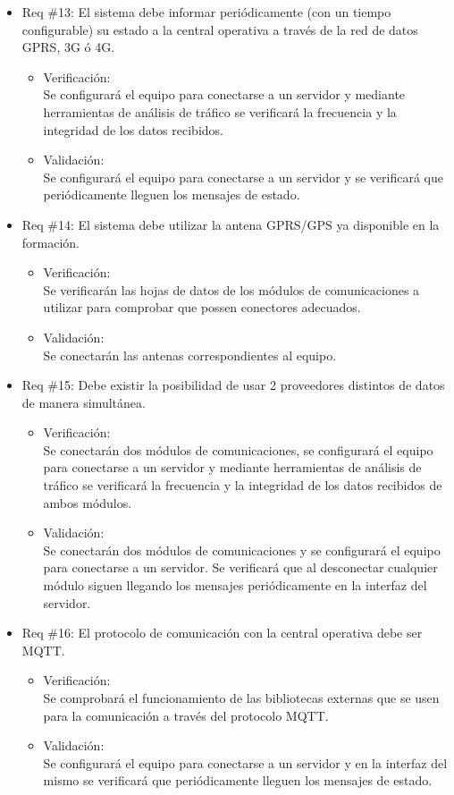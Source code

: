 \documentclass[11pt]{charter}
\begin{document}
\begin{itemize}
\item Req \#13: El sistema debe informar periódicamente (con un tiempo configurable) su estado a la central operativa a través de la red de datos GPRS, 3G ó 4G.
\begin{itemize}
  \item Verificación:\\
  Se configurará el equipo para conectarse a un servidor y mediante herramientas de análisis de tráfico se verificará la frecuencia y la integridad de los datos recibidos.
  \item Validación:\\
  Se configurará el equipo para conectarse a un servidor y se verificará que periódicamente lleguen los mensajes de estado.
\end{itemize}

\item Req \#14: El sistema debe utilizar la antena GPRS/GPS ya disponible en la formación.
\begin{itemize}
  \item Verificación:\\
  Se verificarán las hojas de datos de los módulos de comunicaciones a utilizar para comprobar que possen conectores adecuados.
  \item Validación:\\
  Se conectarán las antenas correspondientes al equipo.
\end{itemize}

\item Req \#15: Debe existir la posibilidad de usar 2 proveedores distintos de datos de manera simultánea.
\begin{itemize}
  \item Verificación:\\
  Se conectarán dos módulos de comunicaciones, se configurará el equipo para conectarse a un servidor y mediante herramientas de análisis de tráfico se verificará la frecuencia y la integridad de los datos recibidos de ambos módulos.
  \item Validación:\\
  Se conectarán dos módulos de comunicaciones y se configurará el equipo para conectarse a un servidor. Se verificará que al desconectar cualquier módulo siguen llegando los mensajes periódicamente en la interfaz del servidor.
\end{itemize}

\newpage

\item Req \#16: El protocolo de comunicación con la central operativa debe ser MQTT.
\begin{itemize}
  \item Verificación:\\
  Se comprobará el funcionamiento de las bibliotecas externas que se usen para la comunicación a través del protocolo MQTT.
  \item Validación:\\
  Se configurará el equipo para conectarse a un servidor y en la interfaz del mismo se verificará que periódicamente lleguen los mensajes de estado.
\end{itemize}


\end{itemize}
\end{document}
